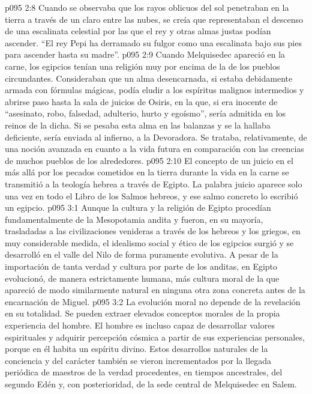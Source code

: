\vs p095 2:8 Cuando se observaba que los rayos oblicuos del sol penetraban en la tierra a través de un claro entre las nubes, se creía que representaban el descenso de una escalinata celestial por las que el rey y otras almas justas podían ascender. “El rey Pepi ha derramado su fulgor como una escalinata bajo sus pies para ascender hasta su madre”.
\vs p095 2:9 Cuando Melquisedec apareció en la carne, los egipcios tenían una religión muy por encima de la de los pueblos circundantes. Consideraban que un alma desencarnada, si estaba debidamente armada con fórmulas mágicas, podía eludir a los espíritus malignos intermedios y abrirse paso hasta la sala de juicios de Osiris, en la que, si era inocente de “asesinato, robo, falsedad, adulterio, hurto y egoísmo”, sería admitida en los reinos de la dicha. Si se pesaba esta alma en las balanzas y se la hallaba deficiente, sería enviada al infierno, a la Devoradora. Se trataba, relativamente, de una noción avanzada en cuanto a la vida futura en comparación con las creencias de muchos pueblos de los alrededores.
\vs p095 2:10 El concepto de un juicio en el más allá por los pecados cometidos en la tierra durante la vida en la carne se transmitió a la teología hebrea a través de Egipto. La palabra juicio aparece solo una vez en todo el Libro de los Salmos hebreos, y ese salmo concreto lo escribió un egipcio.
\vs p095 3:1 Aunque la cultura y la religión de Egipto procedían fundamentalmente de la Mesopotamia andita y fueron, en su mayoría, trasladadas a las civilizaciones venideras a través de los hebreos y los griegos, en muy considerable medida, el idealismo social y ético de los egipcios surgió y se desarrolló en el valle del Nilo de forma puramente evolutiva. A pesar de la importación de tanta verdad y cultura por parte de los anditas, en Egipto evolucionó, de manera estrictamente humana, más cultura moral de la que apareció de modo similarmente natural en ninguna otra zona concreta antes de la encarnación de Miguel.
\vs p095 3:2 La evolución moral no depende de la revelación en su totalidad. Se pueden extraer elevados conceptos morales de la propia experiencia del hombre. El hombre es incluso capaz de desarrollar valores espirituales y adquirir percepción cósmica a partir de sus experiencias personales, porque en él habita un espíritu divino. Estos desarrollos naturales de la conciencia y del carácter también se vieron incrementados por la llegada periódica de maestros de la verdad procedentes, en tiempos ancestrales, del segundo Edén y, con posterioridad, de la sede central de Melquisedec en Salem.
